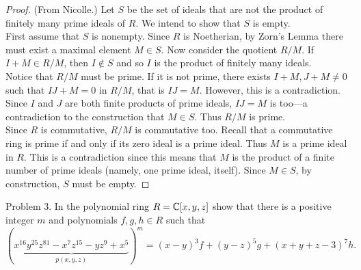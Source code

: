 \documentclass{article}
\begin{document}
\begin{proof}(From Nicolle.)
  Let $S$ be the set of ideals that are not the product of finitely many prime
  ideals of $R$. We intend to show that $S$ is empty.
  \\

  First assume that $S$ is nonempty. Since $R$ is Noetherian, by Zorn's Lemma there must exist a
  maximal element $M \in S$.
  Now consider the quotient $R/M$. If $I + M \in R/M$, then $I \not\in S$
  and so $I$ is the product of finitely many ideals.
  \\

  Notice that $R/M$ must be prime. If it is not prime, there exists
  $I + M, J + M \neq 0$ such that $IJ + M = 0$ in $R/M$, that is $IJ = M$.
  However, this is a contradiction. Since $I$ and $J$ are both finite products
  of prime ideals, $IJ = M$ is too---a contradiction to the construction that
  $M \in S$. Thus $R/M$ is prime.
  \\

  Since $R$ is commutative, $R/M$ is commutative too. Recall that a commutative ring is prime if and only if its zero ideal is a prime ideal. Thus $M$ is a prime ideal in $R$. This is a contradiction since this means that $M$ is the product of a finite number of prime ideals (namely, one prime ideal, itself).
  Since $M \in S$, by construction, $S$ must be empty.
\end{proof}
\pagebreak

\begin{subsection}{Problem 3.}
  In the polynomial ring $R = \mathbb C[x,y,z]$ show that there is a positive integer $m$ and polynomials $f,g,h \in R$ such that \[
    (\underbrace{x^{16}y^{25}z^{81} - x^{7}z^{15} - yz^{9} + x^5}_{p(x,y,z)})^m =
    (x - y)^3f +
    (y - z)^5g +
    (x + y + z - 3)^7h.
  \]
\end{subsection}
\end{document}
